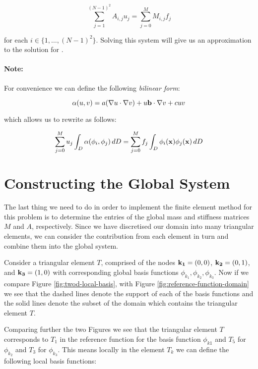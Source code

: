 \begin{equation}
    \sum_{j=1}^{(N-1)^2}A_{i,j}u_j =
    \sum_{j=0}^MM_{i,j}f_j
\end{equation}

for each $i \in \{1, \ldots, (N-1)^2\}$. Solving this system will give us an
approximation to the solution for .

\paragraph{Note:}

For convenience we can define the following \textit{bilinear form}:

\begin{equation}\label{eq:twod-deterministic-bilinear}
    \alpha(u,v) = a(\nabla u \cdot \nabla v) + u\mathbf{b} \cdot \nabla v
                 + cuv
\end{equation}

which allows us to rewrite  as follows:

\begin{equation}
    \sum_{j = 0}^Mu_j\int_D\alpha(\phi_i,\phi_j)\, dD
        = \sum_{j = 0}^Mf_j\int_D\phi_i(\mathbf{x})\phi_j(\mathbf{x})\, dD
\end{equation}

\section{Constructing the Global System}

The last thing we need to do in order to implement the finite element method
for this problem is to determine the entries of the global mass and stiffness
matrices $M$ and $A$, respectively. Since we have discretised our domain into
many triangular elements, we can consider the contribution from each element
in turn and combine them into the global system.

Consider a triangular element $T$, comprised of the nodes $\mathbf{k_1} = (0,0)$,
$\mathbf{k_2} = (0,1)$, and $\mathbf{k_3} = (1,0)$ with corresponding global basis functions
$\phi_{k_1}, \phi_{k_2}, \phi_{k_3}$. Now if we compare Figure
\ref{fig:twod-local-basis}, with Figure \ref{fig:reference-function-domain}
we see that the dashed lines denote the support of each of the basis functions
and the solid lines denote the subset of the domain which contains the triangular
element $T$.

Comparing further the two Figures we see that the triangular element $T$
corresponds to $T_1$ in the reference function for the basis function $\phi_{k1}$
and $T_5$ for $\phi_{k_2}$ and $T_3$ for $\phi_{k_3}$. This means locally in the
element $T_k$ we can define the following local basis functions:

